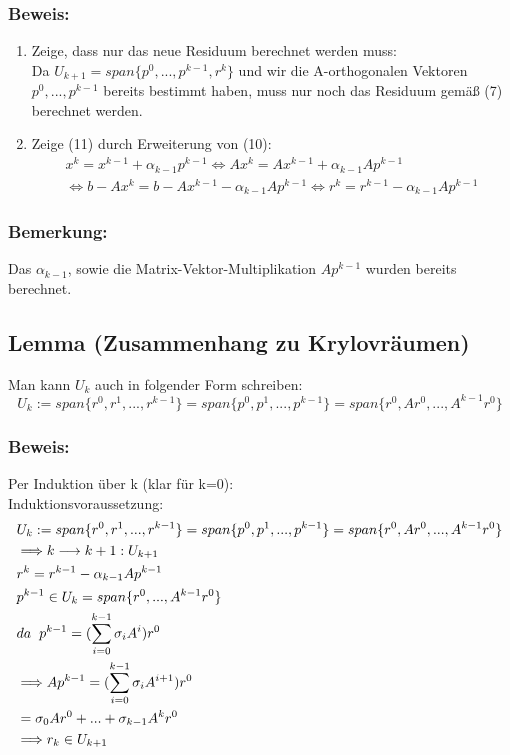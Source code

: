 \documentclass{article}
\begin{document}
\subsubsection{Beweis:}
\begin{enumerate}
\item Zeige, dass nur das neue Residuum berechnet werden muss:
\\Da $U_{k+1} = span\{p^{0},...,p^{k-1},r^{k}\}$ und wir die A-orthogonalen Vektoren $p^{0},...,p^{k-1}$ bereits bestimmt haben, muss nur noch das Residuum gemäß (7) berechnet werden.
\item Zeige (11) durch Erweiterung von (10):
\begin{equation*}
\begin{split}
x^{k} = x^{k-1} + \alpha_{k-1}p^{k-1}
\Longleftrightarrow Ax^{k} = Ax^{k-1} + \alpha_{k-1}Ap^{k-1}\\
\Longleftrightarrow b - Ax^{k} = b - Ax^{k-1} - \alpha_{k-1}Ap^{k-1}
\Longleftrightarrow r^{k} = r^{k-1} - \alpha_{k-1}Ap^{k-1}
\end{split}
\end{equation*}
\end{enumerate}

\subsubsection{Bemerkung:}
Das $\alpha_{k-1}$, sowie die Matrix-Vektor-Multiplikation $Ap^{k-1}$ wurden bereits berechnet.

\subsection{Lemma (Zusammenhang zu Krylovräumen)}
Man kann $U_{k}$ auch in folgender Form schreiben:
\begin{equation}
U_{k} := span\{r^{0}, r^{1},...,r^{k-1}\} = span\{p^{0},p^{1},...,p^{k-1}\} = span\{r^{0}, Ar^{0},...,A^{k-1}r^{0}\}
\end{equation}

\subsubsection{Beweis:}
Per Induktion über k (klar für k=0):
\\Induktionsvoraussetzung:
\begin{align*}
& U_{k} := span\{r^{0}, r^{1},...,r^{k-1}\} = span\{p^{0},p^{1},...,p^{k-1}\} = span\{r^{0}, Ar^{0},...,A^{k-1}r^{0}\}\\
& \Longrightarrow k \longrightarrow k+1: U_{k+1}\\
& r^{k} = r^{k-1} - \alpha_{k-1} Ap^{k-1}\\
& p^{k-1} \in U_{k} = span\{r^{0},...,A^{k-1}r^{0}\}\\
& da \hspace{2mm} p^{k-1} = (\sum_{i=0}^{k-1} \sigma_{i}A^{i})r^{0}\\
& \Longrightarrow Ap^{k-1} = (\sum_{i=0}^{k-1} \sigma_{i}A^{i+1})r^{0}\\
& = \sigma_{0}Ar^{0} + ... + \sigma_{k-1}A^{k}r^{0}\\
& \Longrightarrow r_{k} \in U_{k+1}
\end{align*}
\end{document}
